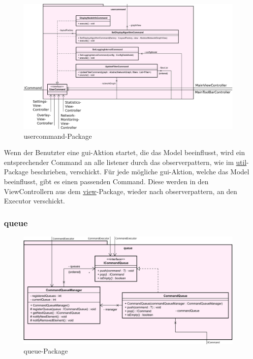       \begin{figure}[H]
        \centering
        \includegraphics[width=\textwidth]{../diagramimages/usercommand.png}
        \caption{usercommand-Package}
      \end{figure}

      \medskip
      Wenn der Benutzter eine \gls{gui}-Aktion startet, die das Model beeinflusst,
      wird ein entsprechender Command an alle \gls{listener} durch das \gls{observerpattern}, wie im
      \hyperref[subsec:util]{util}-Package beschrieben, verschickt. Für jede mögliche
      \gls{gui}-Aktion, welche das Model beeinflusst, gibt es einen passenden Command.
      Diese werden in den ViewControllern aus dem \hyperref[subsec:view]{view}-Package, wieder nach \gls{observerpattern},
      an den Executor verschickt.

      \subsubsection{queue}
      \label{subsubsec:queue}

      \begin{figure}[H]
        \centering
        \includegraphics[width=\textwidth]{../diagramimages/queue.png}
        \caption{queue-Package}
      \end{figure}

